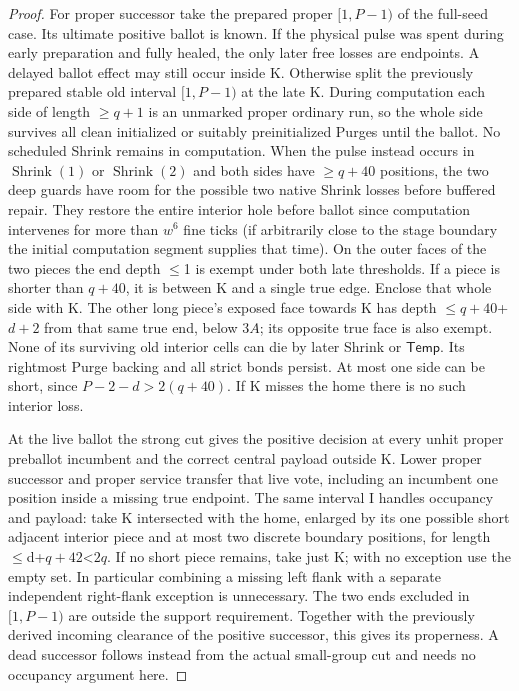 \begin{proof}
For proper successor take the prepared proper \([1,P- 1)\) of the full-seed case. Its ultimate positive ballot is known. If the physical pulse was spent during early preparation and fully healed, the only later free losses are endpoints. A delayed ballot effect may still occur inside K. Otherwise split the previously prepared stable old interval \([1,P- 1)\) at the late K. During computation each side of length \(\ge\)\(q+1\) is an unmarked proper ordinary run, so the whole side survives all clean initialized or suitably preinitialized Purges until the ballot. No scheduled Shrink remains in computation. When the pulse instead occurs in \(\operatorname{Shrink}(1)\) or \(\operatorname{Shrink}(2)\) and both sides have \(\ge\)\(q+40\) positions, the two deep guards have room for the possible two native Shrink losses before buffered repair. They restore the entire interior hole before ballot since computation intervenes for more than \(w^6\) fine ticks (if arbitrarily close to the stage boundary the initial computation segment supplies that time). On the outer faces of the two pieces the end depth \(\le\)1 is exempt under both late thresholds. If a piece is shorter than \(q+40\), it is between K and a single true edge. Enclose that whole side with K. The other long piece's exposed face towards K has depth \(\le\)\(q+40\)+\(d+2\) from that same true end, below \(3A\); its opposite true face is also exempt. None of its surviving old interior cells can die by later Shrink or \(\mathsf{Temp}\). Its rightmost Purge backing and all strict bonds persist. At most one side can be short, since \(P- 2- d>2(q+40)\). If K misses the home there is no such interior loss.

At the live ballot the strong cut gives the positive decision at every unhit proper preballot incumbent and the correct central payload outside K. Lower proper successor and proper service transfer that live vote, including an incumbent one position inside a missing true endpoint. The same interval I handles occupancy and payload: take K intersected with the home, enlarged by its one possible short adjacent interior piece and at most two discrete boundary positions, for length \(\le\)d+\(q+42\)\textless{}\(2q\). If no short piece remains, take just K; with no exception use the empty set. In particular combining a missing left flank with a separate independent right-flank exception is unnecessary. The two ends excluded in \([1,P- 1)\) are outside the support requirement. Together with the previously derived incoming clearance of the positive successor, this gives its properness. A dead successor follows instead from the actual small-group cut and needs no occupancy argument here.
\end{proof}

